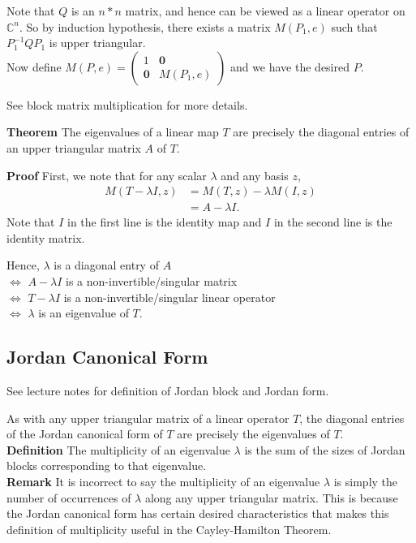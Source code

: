 \documentclass{article}
\begin{document}
Note that $Q$ is an $n*n$ matrix, and hence can be viewed as a linear operator on $\mathbb{C}^n$. So by induction hypothesis, there exists a matrix $M(P_1,e)$ such that $P_1^{-1}QP_1$ is upper triangular.\\
Now define $M(P,e)=\begin{pmatrix}
	1 & \mathbf{0}\\
	\mathbf{0} & M(P_1, e)
\end{pmatrix} 
$ and we have the desired $P$.

See block matrix multiplication for more details.


\textbf{Theorem} The eigenvalues of a linear map $T$ are precisely the diagonal entries of an upper triangular matrix $A$ of $T$. 

\textbf{Proof}
First, we note that for any scalar $\lambda$ and any basis $z$, 
\begin{align*}
	M(T-\lambda I, z)&=M(T,z)-\lambda M(I,z)\\
	&=A-\lambda I.
\end{align*}
Note that $I$ in the first line is the identity map and $I$ in the second line is the identity matrix. 
 
Hence, $\lambda$ is a diagonal entry of $A$ \\
$\iff$ $A-\lambda I$ is a non-invertible/singular matrix \\
$\iff$ $T-\lambda I$ is a non-invertible/singular linear operator\\
$\iff$ $\lambda$ is an eigenvalue of $T$.


\subsection{Jordan Canonical Form}
See lecture notes for definition of Jordan block and Jordan form.

As with any upper triangular matrix of a linear operator $T$, the diagonal entries of the Jordan canonical form of $T$ are precisely the eigenvalues of $T$.\\
\textbf{Definition} The multiplicity of an eigenvalue $\lambda$ is the sum of the sizes of Jordan blocks corresponding to that eigenvalue.\\
\textbf{Remark} It is incorrect to say the multiplicity of an eigenvalue $\lambda$ is simply the number of occurrences of $\lambda$ along any upper triangular matrix. This is because the Jordan canonical form has certain desired characteristics that makes this definition of multiplicity useful in the Cayley-Hamilton Theorem.
\end{document}
